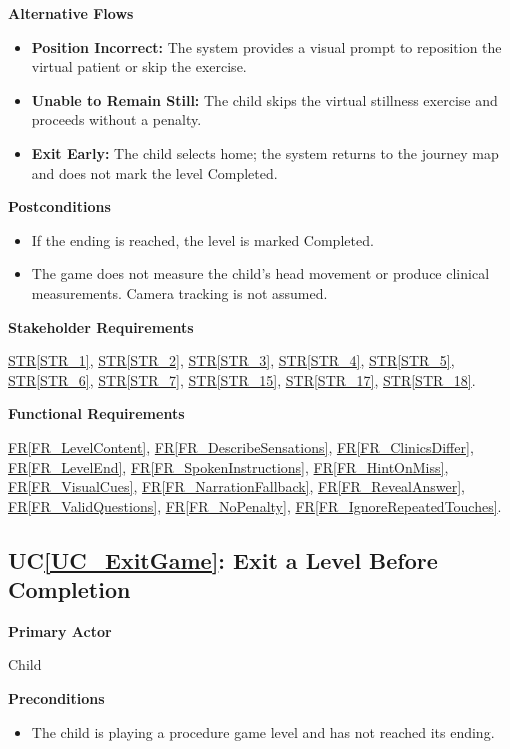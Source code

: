 \documentclass[10pt]{article}
\newcommand{\strref}[1]{\hyperref[#1]{STR\ref*{#1}}}
\newcounter{ucnum} %
\newcommand{\ucheading}[1]{UC\ref*{#1}}
\newcommand{\rref}[1]{\hyperref[#1]{FR\ref*{#1}}}
\begin{document}
\textbf{Alternative Flows}
\begin{itemize}
    \item \textbf{Position Incorrect:} The system provides a visual
    prompt to reposition the virtual patient or skip the exercise.
    \item \textbf{Unable to Remain Still:} The child skips the
    virtual stillness exercise and proceeds without a penalty.
    \item \textbf{Exit Early:} The child selects home; the system
    returns to the journey map and does not mark the level Completed.
\end{itemize}

\textbf{Postconditions}
\begin{itemize}
    \item If the ending is reached, the level is marked Completed.
    \item The game does not measure the child's head movement or
    produce clinical measurements. Camera tracking is not assumed.
\end{itemize}

\textbf{Stakeholder Requirements}

\strref{STR_1}, \strref{STR_2}, \strref{STR_3}, \strref{STR_4}, \strref{STR_5}, \strref{STR_6}, \strref{STR_7}, \strref{STR_15}, \strref{STR_17}, \strref{STR_18}.

\textbf{Functional Requirements}

\rref{FR_LevelContent}, \rref{FR_DescribeSensations}, \rref{FR_ClinicsDiffer}, \rref{FR_LevelEnd}, \rref{FR_SpokenInstructions}, \rref{FR_HintOnMiss}, \rref{FR_VisualCues}, \rref{FR_NarrationFallback}, \rref{FR_RevealAnswer}, \rref{FR_ValidQuestions}, \rref{FR_NoPenalty}, \rref{FR_IgnoreRepeatedTouches}.

\label{UC_ExitGame}
\subsection{\ucheading{UC_ExitGame}: Exit a Level Before Completion}

\textbf{Primary Actor}

Child

\textbf{Preconditions}
\begin{itemize}
    \item The child is playing a procedure game level and has not
    reached its ending.
\end{itemize}
\end{document}
